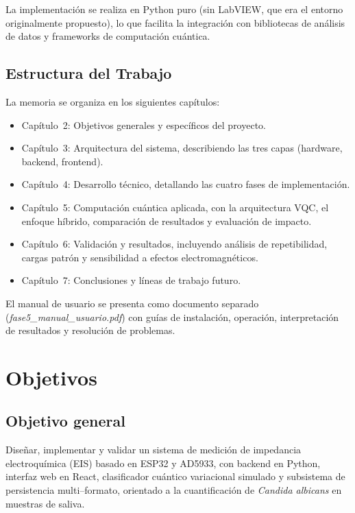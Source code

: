 \documentclass[11pt,a4paper,spanish]{book}
\begin{document}
La implementaci\'{o}n se realiza en Python puro (sin LabVIEW, que era el entorno originalmente propuesto), lo que facilita la integraci\'{o}n con bibliotecas de an\'{a}lisis de datos y frameworks de computaci\'{o}n cu\'{a}ntica.

\section{Estructura del Trabajo}

La memoria se organiza en los siguientes cap\'{i}tulos:
\begin{itemize}
	\item Cap\'{i}tulo~2: Objetivos generales y espec\'{i}ficos del proyecto.
	\item Cap\'{i}tulo~3: Arquitectura del sistema, describiendo las tres capas (hardware, backend, frontend).
	\item Cap\'{i}tulo~4: Desarrollo t\'{e}cnico, detallando las cuatro fases de implementaci\'{o}n.
	\item Cap\'{i}tulo~5: Computaci\'{o}n cu\'{a}ntica aplicada, con la arquitectura VQC, el enfoque h\'{i}brido, comparaci\'{o}n de resultados y evaluaci\'{o}n de impacto.
	\item Cap\'{i}tulo~6: Validaci\'{o}n y resultados, incluyendo an\'{a}lisis de repetibilidad, cargas patr\'{o}n y sensibilidad a efectos electromagn\'{e}ticos.
	\item Cap\'{i}tulo~7: Conclusiones y l\'{i}neas de trabajo futuro.
\end{itemize}

\noindent El manual de usuario se presenta como documento separado (\textit{fase5\_manual\_usuario.pdf}) con gu\'{i}as de instalaci\'{o}n, operaci\'{o}n, interpretaci\'{o}n de resultados y resoluci\'{o}n de problemas.

\chapter{Objetivos}

\section{Objetivo general}

Dise\~{n}ar, implementar y validar un sistema de medici\'{o}n de impedancia electroqu\'{i}mica (EIS) basado en ESP32 y AD5933, con backend en Python, interfaz web en React, clasificador cu\'{a}ntico variacional simulado y subsistema de persistencia multi--formato, orientado a la cuantificaci\'{o}n de \textit{Candida albicans} en muestras de saliva.
\end{document}
